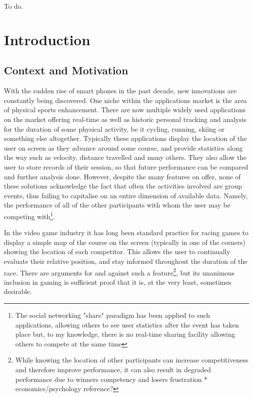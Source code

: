 To do.


\cleardoublepage        %

\setcounter{page}{1}
\pagestyle{headings}

\chapter{Introduction}

\section{Context and Motivation}

With the sudden rise of smart phones in the past decade, new innovations are constantly being discovered. One niche within the applications market is the area of physical sports enhancement. There are now multiple widely used applications on the market offering real-time as well as historic personal tracking and analysis for the duration of some physical activity, be it cycling, running, skiing or something else altogether.
Typically these applications display the location of the user on screen as they advance around some course, and provide statistics along the way such as velocity, distance travelled and many others. They also allow the user to store records of their session, so that future performance can be compared and further analysis done.
However, despite the many features on offer, none of these solutions acknowledge the fact that often the activities involved are group events, thus failing to capitalise on an entire dimension of available data. Namely, the performance of all of the other participants with whom the user may be competing with\footnote{The social networking "share" paradigm has been applied to such applications, allowing others to see user statistics after the event has taken place but, to my knowledge, there is no real-time sharing facility allowing others to compete at the same time}.

In the video game industry it has long been standard practice for racing games to display a simple map of the course on the screen (typically in one of the corners) showing the location of each competitor. This allows the user to continually evaluate their relative position, and stay informed throughout the duration of the race. There are arguments for and against such a feature\footnote{While knowing the location of other participants can increase competitiveness and therefore improve performance, it can also result in degraded performance due to winners competency and losers frustration * economics/psychology reference?}, but its unanimous inclusion in gaming is sufficient proof that it is, at the very least, sometimes desirable.

